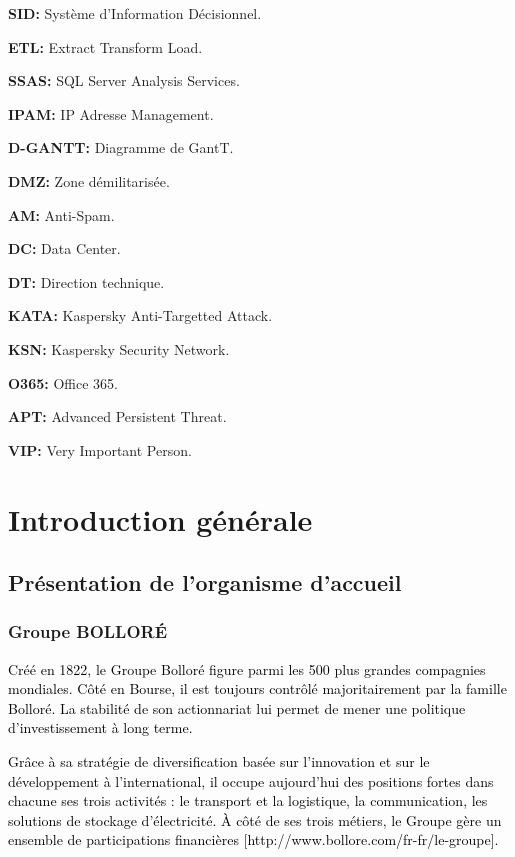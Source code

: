 \documentclass[a4paper,12pt]{report}
\begin{document}
\textbf{SID:} Système d’Information Décisionnel.

\textbf{ETL: }Extract Transform Load.

\textbf{SSAS: } SQL Server Analysis Services.

\textbf{IPAM: }IP Adresse Management.

\textbf{D-GANTT: }Diagramme de GantT.

\textbf{DMZ: }Zone démilitarisée.

\textbf{AM: }Anti-Spam.

\textbf{DC: }Data Center.

\textbf{DT: }Direction technique.

\textbf{KATA: }Kaspersky Anti-Targetted Attack.

\textbf{KSN: }Kaspersky Security Network.

\textbf{O365: }Office 365.

\textbf{APT: }Advanced Persistent Threat.

\textbf{VIP: }Very Important Person.




\newpage
{}
\chapter{Introduction générale}
\vspace{-1cm}
\section{Présentation de l’organisme d’accueil }

\subsection{Groupe BOLLORÉ}
\textcolor{black}{
Créé en 1822, le Groupe Bolloré figure parmi les 500 plus grandes compagnies mondiales. }
\textcolor{black}{Côté en Bourse, il est toujours contrôlé majoritairement par la famille Bolloré. La stabilité de son actionnariat lui permet de mener une politique d'investissement à long terme.}

\textcolor{black}{Grâce à sa stratégie de diversification basée sur l'innovation et sur le développement à l'international, il occupe aujourd'hui des positions fortes dans chacune ses trois activités : le transport et la logistique, la communication, les solutions de stockage d'électricité.
À côté de ses trois métiers, le Groupe gère un ensemble de participations financières [http://www.bollore.com/fr-fr/le-groupe].}
\end{document}
